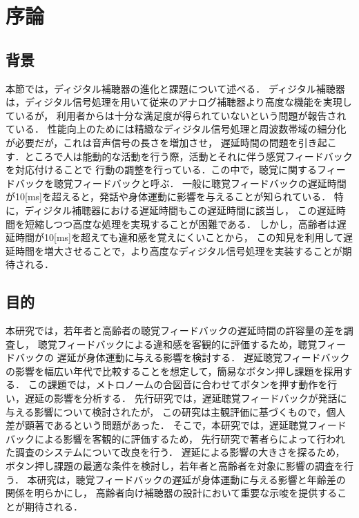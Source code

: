 \section{序論}
\subsection{背景}
本節では，ディジタル補聴器の進化と課題について述べる．
ディジタル補聴器は，ディジタル信号処理を用いて従来のアナログ補聴器より高度な機能を実現しているが，
利用者からは十分な満足度が得られていないという問題が報告されている\cite{cf:Manzokudo}．
性能向上のためには精緻なディジタル信号処理と周波数帯域の細分化が必要だが，これは音声信号の長さを増加させ，
遅延時間の問題を引き起こす．ところで人は能動的な活動を行う際，活動とそれに伴う感覚フィードバックを対応付けることで
行動の調整を行っている．この中で，聴覚に関するフィードバックを聴覚フィードバックと呼ぶ\cite{cf:DAF}．
一般に聴覚フィードバックの遅延時間が10[ms]を超えると，発話や身体運動に影響を与えることが知られている\cite{cf:DelayTime-ninnchi}．
特に，ディジタル補聴器における遅延時間もこの遅延時間に該当し，
この遅延時間を短縮しつつ高度な処理を実現することが困難である．
しかし，高齢者は遅延時間が10[ms]を超えても違和感を覚えにくいことから，
この知見を利用して遅延時間を増大させることで，より高度なディジタル信号処理を実装することが期待される．
\subsection{目的}
本研究では，若年者と高齢者の聴覚フィードバックの遅延時間の許容量の差を調査し，
聴覚フィードバックによる違和感を客観的に評価するため，聴覚フィードバックの
遅延が身体運動に与える影響を検討する．
遅延聴覚フィードバックの影響を幅広い年代で比較することを想定して，簡易なボタン押し課題を採用する．
この課題では，メトロノームの合図音に合わせてボタンを押す動作を行い，遅延の影響を分析する．
先行研究\cite{cf:kayama}では，遅延聴覚フィードバックが発話に与える影響について検討されたが，
この研究は主観評価に基づくもので，個人差が顕著であるという問題があった．
そこで，本研究では，遅延聴覚フィードバックによる影響を客観的に評価するため，
先行研究\cite{cf:shigematu}で著者らによって行われた調査のシステムについて改良を行う．
遅延による影響の大きさを探るため，ボタン押し課題の最適な条件を検討し，若年者と高齢者を対象に影響の調査を行う．
本研究は，聴覚フィードバックの遅延が身体運動に与える影響と年齢差の関係を明らかにし，
高齢者向け補聴器の設計において重要な示唆を提供することが期待される．